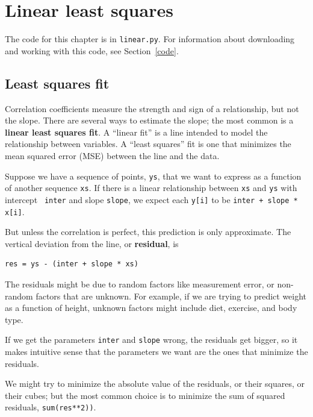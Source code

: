 \documentclass[12pt]{book}
\begin{document}
\chapter{Linear least squares}
\label{linear}

The code for this chapter is in {\tt linear.py}.  For information
about downloading and working with this code, see Section~\ref{code}.

\section{Least squares fit}

Correlation coefficients measure the strength and sign of a
relationship, but not the slope.  There are several ways to estimate
the slope; the most common is a {\bf linear least squares fit}.  A
``linear fit'' is a line intended to model the relationship between
variables.  A ``least squares'' fit is one that minimizes the mean
squared error (MSE) between the line and the data.

Suppose we have a sequence of points, {\tt ys}, that we want to
express as a function of another sequence {\tt xs}.  If there is a
linear relationship between {\tt xs} and {\tt ys} with intercept {\tt
  inter} and slope {\tt slope}, we expect each {\tt y[i]} to be
{\tt inter + slope * x[i]}.  

But unless the correlation is perfect, this prediction is only
approximate.  The vertical deviation from the line, or {\bf residual},
is

\begin{verbatim}
res = ys - (inter + slope * xs)
\end{verbatim}

The residuals might be due to random factors like measurement error,
or non-random factors that are unknown.  For example, if we are
trying to predict weight as a function of height, unknown factors
might include diet, exercise, and body type.

If we get the parameters {\tt inter} and {\tt slope} wrong, the residuals
get bigger, so it makes intuitive sense that the parameters we want
are the ones that minimize the residuals.

We might try to minimize the absolute value of the
residuals, or their squares, or their cubes; but the most common
choice is to minimize the sum of squared residuals,
{\tt sum(res**2))}.
\end{document}
